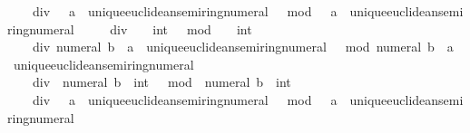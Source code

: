 \begin{isabellebody}
\ \ \ {\isachardoublequoteopen}{}\ div\ {}\ {\isacharcolon}{\kern0pt}{\isacharcolon}{\kern0pt}\ {\isacharprime}{\kern0pt}a\ {\isacharcolon}{\kern0pt}{\isacharcolon}{\kern0pt}\ unique{\isacharunderscore}{\kern0pt}euclidean{\isacharunderscore}{\kern0pt}semiring{\isacharunderscore}{\kern0pt}numeral{\isachardoublequoteclose}\ {\isacharbar}{\kern0pt}\ {\isachardoublequoteopen}{}\ mod\ {}\ {\isacharcolon}{\kern0pt}{\isacharcolon}{\kern0pt}\ {\isacharprime}{\kern0pt}a\ {\isacharcolon}{\kern0pt}{\isacharcolon}{\kern0pt}\ unique{\isacharunderscore}{\kern0pt}euclidean{\isacharunderscore}{\kern0pt}semiring{\isacharunderscore}{\kern0pt}numeral{\isachardoublequoteclose}\ {\isacharbar}{\kern0pt}\isanewline
\ \ \ {\isachardoublequoteopen}{}\ div\ {\isacharminus}{\kern0pt}\ {}\ {\isacharcolon}{\kern0pt}{\isacharcolon}{\kern0pt}\ int{\isachardoublequoteclose}\ {\isacharbar}{\kern0pt}\ {\isachardoublequoteopen}{}\ mod\ {\isacharminus}{\kern0pt}\ {}\ {\isacharcolon}{\kern0pt}{\isacharcolon}{\kern0pt}\ int{\isachardoublequoteclose}\ {\isacharbar}{\kern0pt}\isanewline
\ \ \ {\isachardoublequoteopen}{}\ div\ numeral\ b\ {\isacharcolon}{\kern0pt}{\isacharcolon}{\kern0pt}\ {\isacharprime}{\kern0pt}a\ {\isacharcolon}{\kern0pt}{\isacharcolon}{\kern0pt}\ unique{\isacharunderscore}{\kern0pt}euclidean{\isacharunderscore}{\kern0pt}semiring{\isacharunderscore}{\kern0pt}numeral{\isachardoublequoteclose}\ {\isacharbar}{\kern0pt}\ {\isachardoublequoteopen}{}\ mod\ numeral\ b\ {\isacharcolon}{\kern0pt}{\isacharcolon}{\kern0pt}\ {\isacharprime}{\kern0pt}a\ {\isacharcolon}{\kern0pt}{\isacharcolon}{\kern0pt}\ unique{\isacharunderscore}{\kern0pt}euclidean{\isacharunderscore}{\kern0pt}semiring{\isacharunderscore}{\kern0pt}numeral{\isachardoublequoteclose}\ {\isacharbar}{\kern0pt}\isanewline
\ \ \ {\isachardoublequoteopen}{}\ div\ {\isacharminus}{\kern0pt}\ numeral\ b\ {\isacharcolon}{\kern0pt}{\isacharcolon}{\kern0pt}\ int{\isachardoublequoteclose}\ {\isacharbar}{\kern0pt}\ {\isachardoublequoteopen}{}\ mod\ {\isacharminus}{\kern0pt}\ numeral\ b\ {\isacharcolon}{\kern0pt}{\isacharcolon}{\kern0pt}\ int{\isachardoublequoteclose}\ {\isacharbar}{\kern0pt}\isanewline
\ \ \ {\isachardoublequoteopen}{}\ div\ {}\ {\isacharcolon}{\kern0pt}{\isacharcolon}{\kern0pt}\ {\isacharprime}{\kern0pt}a\ {\isacharcolon}{\kern0pt}{\isacharcolon}{\kern0pt}\ unique{\isacharunderscore}{\kern0pt}euclidean{\isacharunderscore}{\kern0pt}semiring{\isacharunderscore}{\kern0pt}numeral{\isachardoublequoteclose}\ {\isacharbar}{\kern0pt}\ {\isachardoublequoteopen}{}\ mod\ {}\ {\isacharcolon}{\kern0pt}{\isacharcolon}{\kern0pt}\ {\isacharprime}{\kern0pt}a\ {\isacharcolon}{\kern0pt}{\isacharcolon}{\kern0pt}\ unique{\isacharunderscore}{\kern0pt}euclidean{\isacharunderscore}{\kern0pt}semiring{\isacharunderscore}{\kern0pt}numeral{\isachardoublequoteclose}\ {\isacharbar}{\kern0pt}\isanewline

\end{isabellebody}
